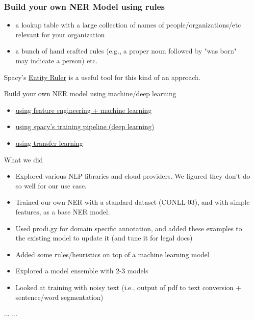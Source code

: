 \documentclass{beamer}
\begin{document}
\begin{frame}
\frametitle{Build your own NER Model using rules}
\begin{itemize}
\item a lookup table with a large collection of names of people/organizations/etc relevant for your organization \pause
\item a bunch of hand crafted rules (e.g., a proper noun followed by "was born" may indicate a person) etc.
\end{itemize}
Spacy's \href{https://spacy.io/usage/rule-based-matching#entityruler}{Entity Ruler} is a useful tool for this kind of an approach. 
\end{frame}

\begin{frame}{Build your own NER model using machine/deep learning}
\begin{itemize}
    \item \href{https://github.com/practical-nlp/practical-nlp/blob/master/Ch5/02_NERTraining.ipynb}{using feature engineering + machine learning}
    \item \href{https://github.com/practical-nlp/practical-nlp/blob/master/Ch5/04_NER_using_spaCy - CoNLL.ipynb}{using spacy's training pipeline (deep learning)}
    \item \href{https://github.com/practical-nlp/practical-nlp/blob/master/Ch5/05_BERT_CONLL_NER.ipynb}{using transfer learning}
\end{itemize} 
\end{frame}

\begin{frame}{What we did}
    \begin{itemize}
        \item Explored various NLP libraries and cloud providers. We figured they don't do so well for our use case.
        \item Trained our own NER with a standard dataset (CONLL-03), and with simple features, as a base NER model.
        \item Used prodi.gy for domain specific annotation, and added these examples to the existing model to update it (and tune it for legal docs)
        \item Added some rules/heuristics on top of a machine learning model
        \item Explored a model ensemble with 2-3 models
        \item Looked at training with noisy text (i.e., output of pdf to text conversion + sentence/word segmentation)
    \end{itemize}
    ... ... 
\end{frame}
\end{document}
